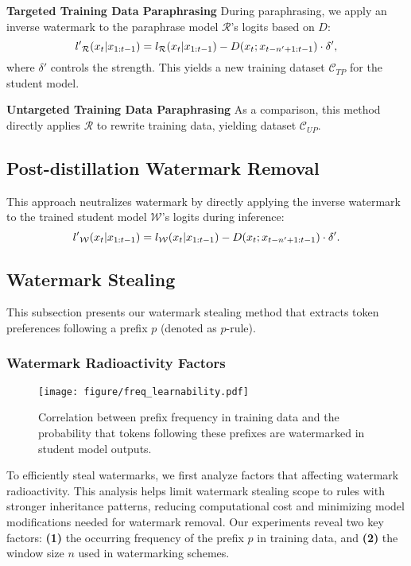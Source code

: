 \vspace{3pt}

\noindent\textbf{Targeted Training Data Paraphrasing} \quad During paraphrasing, we apply an inverse watermark to the paraphrase model $\mathcal{R}$'s logits based on $D$:
\begin{equation}
\small
{l'}_\mathcal{R}(x_t|x_{1:t-1}) = l_\mathcal{R}(x_t|{x_{1:t-1}}) - D(x_t; x_{t-n'+1:t-1}) \cdot \delta',
\end{equation}
where $\delta'$ controls the strength. This yields a new training dataset $\mathcal{C}_{TP}$ for the student model.

\vspace{3pt}

\noindent \textbf{Untargeted Training Data Paraphrasing} \quad As a comparison, this method directly applies $\mathcal{R}$ to rewrite training data, yielding dataset $\mathcal{C}_{UP}$.

\subsection{Post-distillation Watermark Removal}
\label{sec:post-distillation}
This approach neutralizes watermark by directly applying the inverse watermark to the trained student model $\mathcal{W}$'s logits during inference:
\begin{equation}
    \small
    {l'}_\mathcal{W}(x_t|x_{1:t-1}) = l_\mathcal{W}(x_t|{x_{1:t-1}}) - D(x_t; x_{t-n'+1:t-1}) \cdot \delta'.
\end{equation}

\vspace{-10pt}

\subsection{Watermark Stealing}
\label{sec:watermark-stealing}
This subsection presents our watermark stealing method that extracts token preferences following a prefix $p$ (denoted as $p$-rule).

\subsubsection{Watermark Radioactivity Factors}
\label{sec:factors}
\begin{figure}[t]
    \centering
    \texttt{[image: figure/freq\_learnability.pdf]}
    \caption{Correlation between prefix frequency in training data and the probability that tokens following these prefixes are watermarked in student model outputs.}
    \label{fig:freq_learnability}
    \vspace{-10pt}
\end{figure}
To efficiently steal watermarks, we first analyze factors that affecting watermark radioactivity. This analysis helps limit watermark stealing scope to rules with stronger inheritance patterns, reducing computational cost and minimizing model modifications needed for watermark removal. Our experiments reveal two key factors: \textbf{(1)} the occurring frequency of the prefix $p$ in training data, and \textbf{(2)} the window size $n$ used in watermarking schemes.

